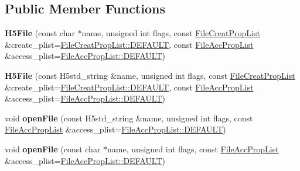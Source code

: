 \subsection*{Public Member Functions}
\begin{DoxyCompactItemize}
\item 
\mbox{\label{class_h5_1_1_h5_file_af25054898de738072217e274217a278c}} 
{\bfseries H5\+File} (const char $\ast$name, unsigned int flags, const \hyperlink{class_h5_1_1_file_creat_prop_list}{File\+Creat\+Prop\+List} \&create\+\_\+plist=\hyperlink{class_h5_1_1_file_creat_prop_list_a4913710830a8ec38fbbda805074377d4}{File\+Creat\+Prop\+List\+::\+D\+E\+F\+A\+U\+LT}, const \hyperlink{class_h5_1_1_file_acc_prop_list}{File\+Acc\+Prop\+List} \&access\+\_\+plist=\hyperlink{class_h5_1_1_file_acc_prop_list_a866e7c16e8840c67a194f3bef8501e48}{File\+Acc\+Prop\+List\+::\+D\+E\+F\+A\+U\+LT})
\item 
\mbox{\label{class_h5_1_1_h5_file_a74bb8e05dde9450227bc27841277375f}} 
{\bfseries H5\+File} (const H5std\+\_\+string \&name, unsigned int flags, const \hyperlink{class_h5_1_1_file_creat_prop_list}{File\+Creat\+Prop\+List} \&create\+\_\+plist=\hyperlink{class_h5_1_1_file_creat_prop_list_a4913710830a8ec38fbbda805074377d4}{File\+Creat\+Prop\+List\+::\+D\+E\+F\+A\+U\+LT}, const \hyperlink{class_h5_1_1_file_acc_prop_list}{File\+Acc\+Prop\+List} \&access\+\_\+plist=\hyperlink{class_h5_1_1_file_acc_prop_list_a866e7c16e8840c67a194f3bef8501e48}{File\+Acc\+Prop\+List\+::\+D\+E\+F\+A\+U\+LT})
\item 
\mbox{\label{class_h5_1_1_h5_file_ab20ea83ffa86b74e13168b6c2fdfd817}} 
void {\bfseries open\+File} (const H5std\+\_\+string \&name, unsigned int flags, const \hyperlink{class_h5_1_1_file_acc_prop_list}{File\+Acc\+Prop\+List} \&access\+\_\+plist=\hyperlink{class_h5_1_1_file_acc_prop_list_a866e7c16e8840c67a194f3bef8501e48}{File\+Acc\+Prop\+List\+::\+D\+E\+F\+A\+U\+LT})
\item 
\mbox{\label{class_h5_1_1_h5_file_ae20ef228e7c2db78d31180d3521319ee}} 
void {\bfseries open\+File} (const char $\ast$name, unsigned int flags, const \hyperlink{class_h5_1_1_file_acc_prop_list}{File\+Acc\+Prop\+List} \&access\+\_\+plist=\hyperlink{class_h5_1_1_file_acc_prop_list_a866e7c16e8840c67a194f3bef8501e48}{File\+Acc\+Prop\+List\+::\+D\+E\+F\+A\+U\+LT})

\end{DoxyCompactItemize}
